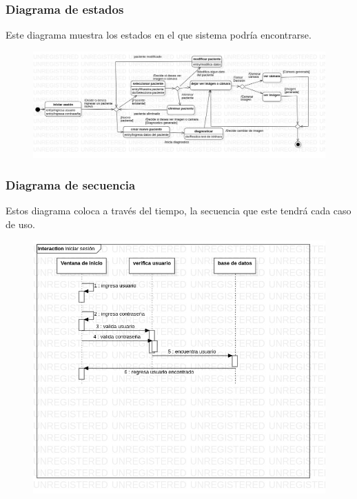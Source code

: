 \documentclass[10pt]{article}
\begin{document}
\subsubsection{Diagrama de estados}

Este diagrama muestra los estados en el que sistema podría encontrarse.

\begin{figure}[H]
	\begin{center}
\includegraphics[scale = 0.35]{UML/StateMachine1!StatechartDiagram1_3.jpg}
	\end{center} 
\end{figure}
\newpage
\subsubsection{Diagrama de secuencia}

Estos diagrama coloca a través del tiempo, la secuencia que este tendrá cada caso de uso.

\begin{figure}[H]
	\begin{center}
\includegraphics[scale = 0.60]{UML/Iniciar_sesion.jpg}
	\end{center} 
\end{figure}
\end{document}
